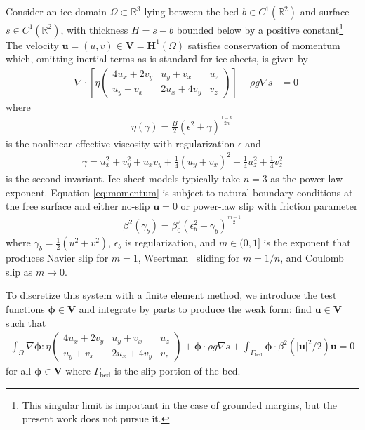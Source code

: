 \documentclass[10pt,letterpaper,oneeqnum,final]{siamltex}
\newcommand{\VV}{\bm V}
\newcommand{\R}{\mathbb R}
\newcommand{\abs}[1]{{\left\lvert #1 \right\rvert}}
\newcommand{\tcolon}{{ : }}
\begin{document}
Consider an ice domain $\Omega \subset \R^3$ lying between the bed $b \in C^1(\R^2)$ and surface $s
\in C^1(\R^2)$, with thickness $H = s-b$ bounded below by a positive constant\footnote{This singular
  limit is important in the case of grounded margins, but the present work does not pursue it.}  The
velocity $\bm u = (u,v) \in \bm V = \bm H^1(\Omega)$ satisfies conservation of momentum which,
omitting inertial terms as is standard for ice sheets, is given by
\begin{align}\label{eq:momentum}
  - \nabla\cdot \left[ \eta
  \begin{pmatrix}
    4 u_x + 2 v_y & u_y + v_x & u_z \\
    u_y + v_x & 2 u_x + 4 v_y & v_z
  \end{pmatrix} \right] + \rho g \nabla s & = 0
\end{align}
where
\begin{align}\label{eq:viscosity}
  \eta(\gamma) = \frac B 2 (\epsilon^2 + \gamma)^{\frac{1-n}{2n}}
\end{align}
is the nonlinear effective viscosity with regularization $\epsilon$ and
\begin{align*}
  \gamma = u_x^2 + v_y^2 + u_xv_y + \frac 1 4 (u_y+v_x)^2 + \frac 1 4 u_z^2 + \frac 1 4 v_z^2
\end{align*}
is the second invariant.  Ice sheet models typically take $n=3$ as the power law exponent.  Equation
\eqref{eq:momentum} is subject to natural boundary conditions at the free surface and either no-slip
$\bm u = 0$ or power-law slip with friction parameter
\begin{align*}
  \beta^2(\gamma_b) = \beta_0^2 (\epsilon_b^2 + \gamma_b)^{\frac{m-1}{2}}
\end{align*}
where $\gamma_b = \frac 1 2 (u^2 + v^2)$, $\epsilon_b$ is regularization, and $m \in (0,1]$ is the
exponent that produces Navier slip for $m=1$, Weertman~\cite{weertman1957sliding} sliding for
$m=1/n$, and Coulomb slip as $m \to 0$.

To discretize this system with a finite element method, we introduce the test functions $\bm \phi
\in \VV$ and integrate by parts to produce the weak form: find $\bm u \in \VV$ such that
\begin{align}\label{eq:weak}
  \int_\Omega \nabla\bm\phi \tcolon \eta
  \begin{pmatrix}
    4 u_x + 2 v_y & u_y + v_x & u_z \\
    u_y + v_x & 2 u_x + 4 v_y & v_z
  \end{pmatrix} + \bm\phi \cdot\rho g \nabla s
  + \int_{\Gamma_{\text{bed}}} \bm \phi \cdot \beta^2(\abs{\bm u}^2/2) \bm u = 0
\end{align}
for all $\bm \phi \in \VV$ where $\Gamma_{\text{bed}}$ is the slip portion of the bed.
\end{document}

